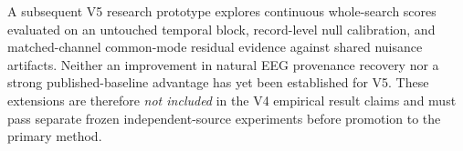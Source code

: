 A subsequent V5 research prototype explores continuous
whole-search scores evaluated on an untouched temporal block,
record-level null calibration, and matched-channel common-mode
residual evidence against shared nuisance artifacts.
Neither an improvement in natural EEG provenance recovery nor
a strong published-baseline advantage has yet been established
for V5. These extensions are therefore \emph{not included} in
the V4 empirical result claims and must pass separate
frozen independent-source experiments before promotion to the
primary method.
